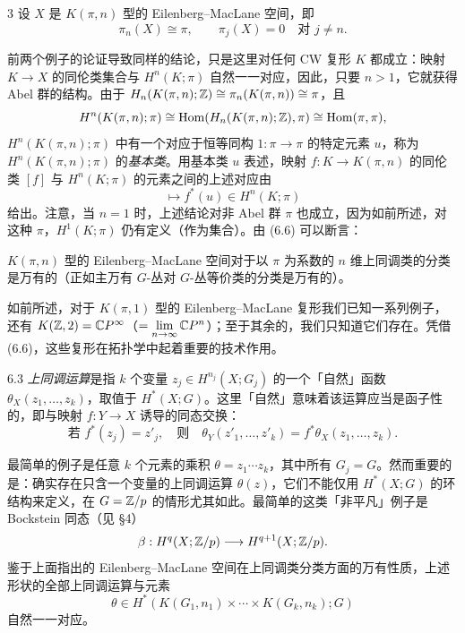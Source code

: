 \begin{example}{3}
设 $X$ 是 $K(\pi,n)$ 型的 Eilenberg--MacLane 空间，即
\[
\pi_n(X)\cong\pi,\qquad \pi_j(X)=0\quad\text{对 } j\ne n.
\]

前两个例子的论证导致同样的结论，只是这里对任何 CW 复形 $K$ 都成立：映射 $K\to X$ 的同伦类集合与 $H^n(K;\pi)$ 自然一一对应，因此，只要 $n>1$，它就获得 Abel 群的结构。由于 $H_n(K(\pi,n);\mathbb{Z})\cong\pi_n(K(\pi,n))\cong\pi$，且
\[
H^n(K(\pi,n);\pi)\cong\operatorname{Hom}(H_n(K(\pi,n);\mathbb{Z}),\pi)\cong\operatorname{Hom}(\pi,\pi),
\]
$H^n(K(\pi,n);\pi)$ 中有一个对应于恒等同构 $1:\pi\to\pi$ 的特定元素 $u$，称为 $H^n(K(\pi,n);\pi)$ 的\emph{基本类}。用基本类 $u$ 表述，映射 $f:K\to K(\pi,n)$ 的同伦类 $[f]$ 与 $H^n(K;\pi)$ 的元素之间的上述对应由
\begin{equation}
[f]\longmapsto f^*(u)\in H^n(K;\pi) \tag{6.6}
\end{equation}
给出。注意，当 $n=1$ 时，上述结论对非 Abel 群 $\pi$ 也成立，因为如前所述，对这种 $\pi$，$H^1(K;\pi)$ 仍有定义（作为集合）。由 (6.6) 可以断言：

$K(\pi,n)$ 型的 Eilenberg--MacLane 空间对于以 $\pi$ 为系数的 $n$ 维上同调类的分类是万有的（正如主万有 $G$-丛对 $G$-丛等价类的分类是万有的）。

如前所述，对于 $K(\pi,1)$ 型的 Eilenberg--MacLane 复形我们已知一系列例子，还有 $K(\mathbb{Z},2)=\mathbb{C}P^\infty$（$=\lim\limits_{n\to\infty}\mathbb{C}P^n$）；至于其余的，我们只知道它们存在。凭借 (6.6)，这些复形在拓扑学中起着重要的技术作用。
\end{example}

\begin{definition*}{6.3}
\emph{上同调运算}是指 $k$ 个变量 $z_j\in H^{n_j}(X;G_j)$ 的一个「自然」函数 $\theta_X(z_1,\dots,z_k)$，取值于 $H^*(X;G)$。这里「自然」意味着该运算应当是函子性的，即与映射 $f:Y\to X$ 诱导的同态交换：
\begin{equation}
\text{若 } f^*(z_j)=z'_j,\quad\text{则}\quad \theta_Y(z'_1,\dots,z'_k)=f^*\theta_X(z_1,\dots,z_k). \tag{6.7}
\end{equation}
\end{definition*}

最简单的例子是任意 $k$ 个元素的乘积 $\theta=z_1\cdots z_k$，其中所有 $G_j=G$。然而重要的是：确实存在只含一个变量的上同调运算 $\theta(z)$，它们不能仅用 $H^*(X;G)$ 的环结构来定义，在 $G=\mathbb{Z}/p$ 的情形尤其如此。最简单的这类「非平凡」例子是 Bockstein 同态（见 §4）
\[
\beta:H^q(X;\mathbb{Z}/p)\longrightarrow H^{q+1}(X;\mathbb{Z}/p).
\]
鉴于上面指出的 Eilenberg--MacLane 空间在上同调类分类方面的万有性质，上述形状的全部上同调运算与元素
\[
\theta\in H^*(K(G_1,n_1)\times\cdots\times K(G_k,n_k);G)
\]
自然一一对应。

